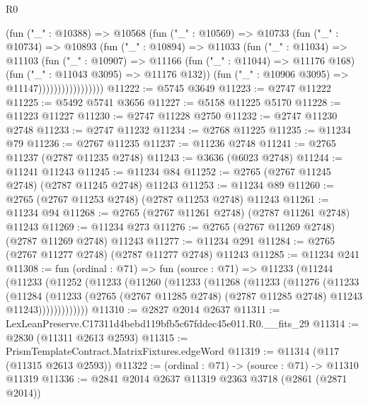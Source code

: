 \begin{lexlean}{R0}
\begin{coremodule}
                          (fun ("_" : @10388) =>
                          @10568
                            (fun ("_" : @10569) =>
                            @10733
                              (fun ("_" : @10734) =>
                              @10893
                                (fun ("_" : @10894) =>
                                @11033
                                  (fun ("_" : @11034) =>
                                  @11103
                                    (fun ("_" : @10907) =>
                                    @11166
                                      (fun ("_" : @11044) => @11176 @168)
                                      (fun ("_" : @11043 @3095) => @11176 @132))
                                    (fun ("_" : @10906 @3095) => @11147)))))))))))))))))
@11222 := @5745 @3649
@11223 := @2747 @11222
@11225 := @5492 @5741 @3656
@11227 := @5158 @11225 @5170
@11228 := @11223 @11227
@11230 := @2747 @11228 @2750
@11232 := @2747 @11230 @2748
@11233 := @2747 @11232
@11234 := @2768 @11225
@11235 := @11234 @79
@11236 := @2767 @11235
@11237 := @11236 @2748
@11241 := @2765 @11237 (@2787 @11235 @2748)
@11243 := @3636 (@6023 @2748)
@11244 := @11241 @11243
@11245 := @11234 @84
@11252 := @2765 (@2767 @11245 @2748) (@2787 @11245 @2748) @11243
@11253 := @11234 @89
@11260 := @2765 (@2767 @11253 @2748) (@2787 @11253 @2748) @11243
@11261 := @11234 @94
@11268 := @2765 (@2767 @11261 @2748) (@2787 @11261 @2748) @11243
@11269 := @11234 @273
@11276 := @2765 (@2767 @11269 @2748) (@2787 @11269 @2748) @11243
@11277 := @11234 @291
@11284 := @2765 (@2767 @11277 @2748) (@2787 @11277 @2748) @11243
@11285 := @11234 @241
@11308 := fun (ordinal : @71) =>
  fun (source : @71) =>
  @11233
    (@11244
      (@11233
        (@11252
          (@11233
            (@11260
              (@11233
                (@11268
                  (@11233
                    (@11276
                      (@11233
                        (@11284
                          (@11233
                            (@2765
                              (@2767 @11285 @2748)
                              (@2787 @11285 @2748)
                              @11243
                              @11243)))))))))))))
@11310 := @2827 @2014 @2637
@11311 := LexLeanPreserve.C17311d4bebd119bfb5c67fddec45e011.R0.__fits_29
@11314 := @2830 (@11311 @2613 @2593)
@11315 := PrismTemplateContract.MatrixFixtures.edgeWord
@11319 := @11314 (@117 (@11315 @2613 @2593))
@11322 := (ordinal : @71) -> (source : @71) -> @11310 @11319
@11336 := @2841
    @2014
    @2637
    @11319
    @2363
    @3718
    (@2861 (@2871 @2014))

\end{coremodule}
\end{lexlean}
